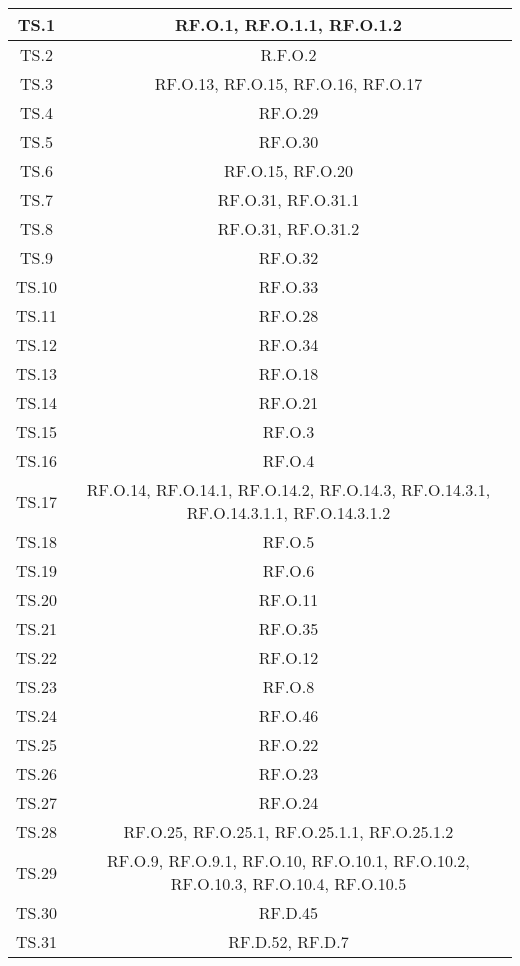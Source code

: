 \begin{adjustwidth}{-0.5cm}{-0.5cm}
\begin{longtable}{|c|c|}
    TS.1 & RF.O.1, RF.O.1.1, RF.O.1.2\\
		\hline TS.2 & R.F.O.2\\
		\hline TS.3 & RF.O.13, RF.O.15, RF.O.16, RF.O.17\\
		\hline TS.4 & RF.O.29\\
		\hline TS.5 & RF.O.30\\
		\hline TS.6 & RF.O.15, RF.O.20\\
		\hline TS.7 & RF.O.31, RF.O.31.1\\
		\hline TS.8 & RF.O.31, RF.O.31.2\\
		\hline TS.9 & RF.O.32\\
		\hline TS.10 & RF.O.33\\
		\hline TS.11 & RF.O.28\\
		\hline TS.12 & RF.O.34\\
		\hline TS.13 & RF.O.18\\
		\hline TS.14 & RF.O.21\\
		\hline TS.15 & RF.O.3\\
		\hline TS.16 & RF.O.4\\
		\hline TS.17 & RF.O.14, RF.O.14.1, RF.O.14.2, RF.O.14.3, RF.O.14.3.1, RF.O.14.3.1.1, RF.O.14.3.1.2\\
		\hline TS.18 & RF.O.5\\
		\hline TS.19 & RF.O.6\\
		\hline TS.20 & RF.O.11\\
		\hline TS.21 & RF.O.35\\
		\hline TS.22 & RF.O.12\\
		\hline TS.23 & RF.O.8\\
		\hline TS.24 & RF.O.46\\
		\hline TS.25 & RF.O.22\\
		\hline TS.26 & RF.O.23\\
		\hline TS.27 & RF.O.24\\
		\hline TS.28 & RF.O.25, RF.O.25.1, RF.O.25.1.1, RF.O.25.1.2\\
		\hline TS.29 & RF.O.9, RF.O.9.1, RF.O.10, RF.O.10.1, RF.O.10.2, RF.O.10.3, RF.O.10.4, RF.O.10.5\\
		\hline TS.30 & RF.D.45\\
		\hline TS.31 & RF.D.52, RF.D.7\\
  \end{longtable}
\end{adjustwidth}
\egroup